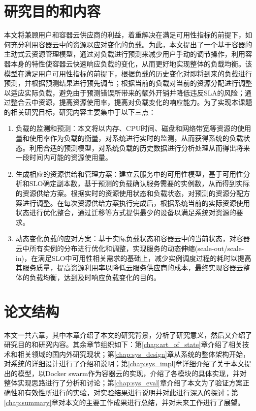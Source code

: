 \section{研究目的和内容}
本文将兼顾用户和容器云供应商的利益，着重解决在满足可用性指标的前提下，如何充分利用容器云中的资源以应对变化的负载。为此，本文提出了一个基于容器的主动式云资源管理模型，通过对负载进行预测来减少用户手动的调节操作，利用容器本身的特性使容器云快速响应负载的变化，从而更好地实现整体的负载均衡。该模型在满足用户可用性指标的前提下，根据负载的历史变化对即将到来的负载进行预测，并根据预测结果进行预先调节；根据当前的负载对当前的资源分配进行调整以适应实际负载，避免由于预测错误所带来的额外开销并降低违反SLA的风险；通过整合云中资源，提高资源使用率，提高对负载变化的响应能力。为了实现本课题的相关研究目标，研究内容主要集中于以下三点：
\begin{enumerate}
\item 负载的监测和预测：本文将以内存、CPU时间、磁盘和网络带宽等资源的使用量和使用率作为负载的衡量，对系统进行实时的监测，从而获得系统的负载状态。利用合适的预测模型，对系统负载的历史数据进行分析处理从而得出将来一段时间内可能的资源使用量。
\item 生成相应的资源供给和管理方案：建立云服务中的可用性模型，基于可用性分析和SLO确定副本数，基于预测的负载确认服务需要的实例数，从而得到实际的资源供给方案。根据实时的资源使用状态和负载状态，对预测的资源分配方案进行调整。在每次资源供给方案执行完成后，根据系统当前的实际资源使用状态进行优化整合，通过迁移等方式提供最少的设备以满足系统对资源的要求。
\item 动态变化负载的应对方案：基于实际负载状态和容器云中的当前状态，对容器云中所有实例的分布进行优化和调整，实现服务的动态伸缩(scale-out/scale-in)，在满足SLO中可用性相关需求的基础上，减少实例调度过程的耗时以提高其服务质量，提高资源利用率以降低云服务供应商的成本，最终实现容器云整体的负载均衡，达到及时响应负载变化的目的。
\end{enumerate}

\section{论文结构}
本文一共六章，其中本章介绍了本文的研究背景，分析了研究意义，然后又介绍了研究目的和研究内容。其余章节组织如下：第\ref{chap:art_of_state}章介绍了相关技术和相关领域的国内外研究现状；第\ref{chap:sys_design}章从系统的整体架构开始，对系统的详细设计进行了介绍和说明；第\ref{chap:sys_impl}章详细介绍了关于本文提出的模型，以Docker swarm作为容器云的实现，介绍了各模块的具体实现，并对整体实现思路进行了分析和讨论；第\ref{chap:sys_eval}章介绍了本文为了验证方案正确性和有效性所进行的实验，对实验结果进行说明并对此进行深入的探讨；第\ref{chap:summary}章对本文的主要工作成果进行总结，并对未来工作进行了展望。